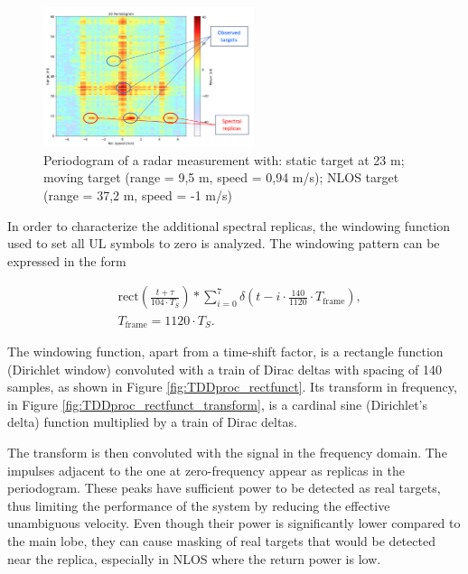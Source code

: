     \begin{figure}[H]
        \centering
        \includegraphics[width=0.55\textwidth]{Images/TDDprocessing/SpectralReplicasDLULpattern.png}
        \caption{Periodogram of a radar measurement with: static target at 23 m; moving target (range = 9,5 m, speed = 0,94 m/s); NLOS target (range = 37,2 m, speed = -1 m/s)}
        \label{fig:SpectralReplicasDLULpattern}
    \end{figure}
    
    In order to characterize the additional spectral replicas, the windowing function used to set all UL symbols to zero is analyzed. The windowing pattern can be expressed in the form
    
    \begin{align}
        &\text{rect}\left( \frac{t + \tau}{104 \cdot T_S}\right) \ast \sum_{i=0}^7 \delta\left( t - i\cdot \frac{140}{1120}\cdot T_{\text{frame}} \right),  \\
        &T_{\text{frame}} = 1120 \cdot T_S.
    \end{align}

    The windowing function, apart from a time-shift factor, is a rectangle function (Dirichlet window) convoluted with a train of Dirac deltas with spacing of 140 samples, as shown in Figure \ref{fig:TDDproc_rectfunct}. Its transform in frequency, in Figure \ref{fig:TDDproc_rectfunct_transform}, is a cardinal sine (Dirichlet's delta) function multiplied by a train of Dirac deltas.

    The transform is then convoluted with the signal in the frequency domain. The impulses adjacent to the one at zero-frequency appear as replicas in the periodogram. These peaks have sufficient power to be detected as real targets, thus limiting the performance of the system by reducing the effective unambiguous velocity. Even though their power is significantly lower compared to the main lobe, they can cause masking of real targets that would be detected near the replica, especially in NLOS where the return power is low. 

